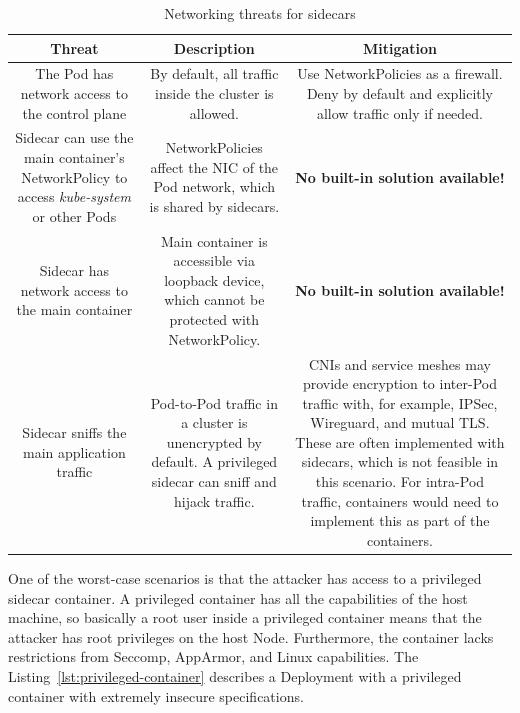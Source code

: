 \documentclass[english, 12pt, a4paper, sci, utf8, a-2b, online]{aaltothesis}
\begin{document}
\begin{table}[H]
  \sffamily
  \centering

  \caption{Networking threats for sidecars}
  \label{table:threat-model-network}

  \begin{minipage}{\textwidth}
  \renewcommand{\thempfootnote}{\arabic{mpfootnote}}
  \begin{tabularx}{\textwidth}{CCC}
    \hline
    \textbf{Threat} & \textbf{Description} & \textbf{Mitigation} \\ \hline
    The Pod has network access to the control plane & By default, all traffic inside the cluster is allowed. & Use NetworkPolicies as a firewall. Deny by default and explicitly allow traffic only if needed. \\ \hline
    Sidecar can use the main container's NetworkPolicy to access \emph{kube-system} or other Pods & NetworkPolicies affect the NIC of the Pod network, which is shared by sidecars. & \textbf{No built-in solution available!} \\ \hline
    Sidecar has network access to the main container & Main container is accessible via loopback device, which cannot be protected with NetworkPolicy. & \textbf{No built-in solution available!} \\ \hline
    Sidecar sniffs the main application traffic & Pod-to-Pod traffic in a cluster is unencrypted by default. A privileged sidecar can sniff and hijack traffic. & CNIs and service meshes may provide encryption to inter-Pod traffic with, for example, IPSec, Wireguard, and mutual TLS. These are often implemented with sidecars, which is not feasible in this scenario. For intra-Pod traffic, containers would need to implement this as part of the containers. \\ \hline
  \end{tabularx}
\end{minipage}
\end{table}

One of the worst-case scenarios is that the attacker has access to a privileged sidecar container.
A privileged container has all the capabilities of the host machine, so basically a root user inside a privileged container means that the attacker has root privileges on the host Node.
Furthermore, the container lacks restrictions from Seccomp, AppArmor, and Linux capabilities.
The Listing~\ref{lst:privileged-container} describes a Deployment with a privileged container with extremely insecure specifications.
\end{document}
